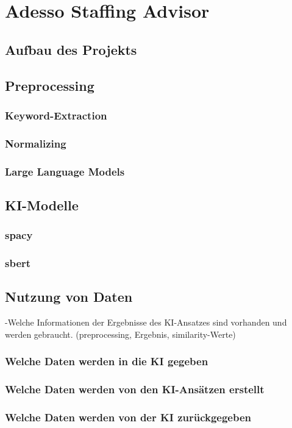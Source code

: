 \chapter{Adesso Staffing Advisor}
\label{chap:staffingadvisor}

\section{Aufbau des Projekts}
\label{sec:ausgangssituation}

\section{Preprocessing}
\label{sec:preprocessing}

\subsection{Keyword-Extraction}

\subsection{Normalizing}

\subsection{Large Language Models}

\section{KI-Modelle}
\label{sec:similaritycalculation}

\subsection{spacy}

\subsection{sbert}

\section{Nutzung von Daten}
\label{chap:ui}

-Welche Informationen der Ergebnisse des KI-Ansatzes sind vorhanden und werden gebraucht. (preprocessing, Ergebnis, similarity-Werte)

\subsection{Welche Daten werden in die KI gegeben}

\subsection{Welche Daten werden von den KI-Ansätzen erstellt}

\subsection{Welche Daten werden von der KI zurückgegeben}

\newpage